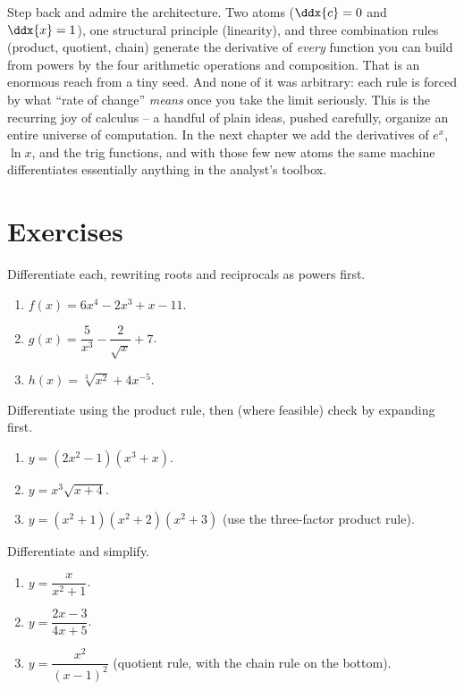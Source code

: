 \begin{aestheticbox}
Step back and admire the architecture. Two atoms ($\ddx{c}=0$ and $\ddx{x}=1$), one
structural principle (linearity), and three combination rules (product, quotient, chain)
generate the derivative of \emph{every} function you can build from powers by the four
arithmetic operations and composition. That is an enormous reach from a tiny seed. And
none of it was arbitrary: each rule is forced by what ``rate of change'' \emph{means}
once you take the limit seriously. This is the recurring joy of calculus -- a handful of
plain ideas, pushed carefully, organize an entire universe of computation. In the next
chapter we add the derivatives of $e^x$, $\ln x$, and the trig functions, and with those
few new atoms the same machine differentiates essentially anything in the analyst's
toolbox.
\end{aestheticbox}

\section{Exercises}
\label{ch11:exercises}

\begin{exercise}
Differentiate each, rewriting roots and reciprocals as powers first.
\begin{enumerate}
  \item $f(x) = 6x^4 - 2x^3 + x - 11$.
  \item $g(x) = \dfrac{5}{x^3} - \dfrac{2}{\sqrt{x}} + 7$.
  \item $h(x) = \sqrt[3]{x^2} + 4x^{-5}$.
\end{enumerate}
\end{exercise}

\begin{exercise}
Differentiate using the product rule, then (where feasible) check by expanding first.
\begin{enumerate}
  \item $y = (2x^2 - 1)(x^3 + x)$.
  \item $y = x^3\sqrt{x+4}$.
  \item $y = (x^2+1)(x^2+2)(x^2+3)$ \;(use the three-factor product rule).
\end{enumerate}
\end{exercise}

\begin{exercise}
Differentiate and simplify.
\begin{enumerate}
  \item $y = \dfrac{x}{x^2+1}$.
  \item $y = \dfrac{2x-3}{4x+5}$.
  \item $y = \dfrac{x^2}{(x-1)^2}$ \;(quotient rule, with the chain rule on the bottom).
\end{enumerate}
\end{exercise}

